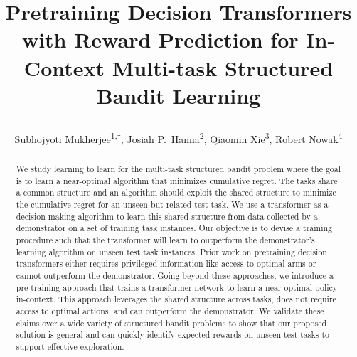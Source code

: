 \documentclass[10pt]{article} %
\title{Pretraining Decision Transformers with Reward Prediction for In-Context Multi-task Structured Bandit Learning

}
\author{Subhojyoti Mukherjee\textsuperscript{1,$\dagger$}, Josiah P.\ Hanna\textsuperscript{2}, Qiaomin Xie\textsuperscript{3}, Robert Nowak\textsuperscript{4}}
\theoremstyle{plain}
\theoremstyle{definition}
\theoremstyle{remark}
\begin{document}
\makeCover  %
\maketitle  %

\begin{abstract}
We study learning to learn for the multi-task structured bandit problem where the goal is to learn a near-optimal algorithm that minimizes cumulative regret. The tasks share a common structure and an algorithm should exploit the shared structure to minimize the cumulative regret for an unseen but related test task. We use a transformer as a decision-making algorithm to learn this shared structure from data collected by a demonstrator on a set of training task instances. Our objective is to devise a training procedure such that the transformer will learn to outperform the demonstrator's learning algorithm on unseen test task instances. Prior work on pretraining decision transformers either requires privileged information like access to optimal arms or cannot outperform the demonstrator. Going beyond these approaches, we introduce a pre-training approach that trains a transformer network to learn a near-optimal policy in-context. This approach leverages the shared structure across tasks, does not require access to optimal actions, and can outperform the demonstrator. We validate these claims over a wide variety of structured bandit problems to show that our proposed solution is general and can quickly identify expected rewards on unseen test tasks to support effective exploration. 

\end{abstract}
\end{document}
